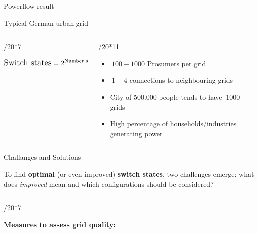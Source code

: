 \documentclass[final]{beamer}
\newlength{\colwidth}
\begin{document}
\begin{frame}[t]
\begin{columns}[t]
\begin{column}{\colwidth}
\begin{block}{Powerflow result}
 \end{block}

  \begin{exampleblock}{Typical German urban grid}

    \begin{columns}[t]
        
      \begin{column}{\colwidth/20*7}

        \begin{equation*}
          \begin{aligned}
           \large \text{Switch states} = 2^{\text{Number switches}}
          \end{aligned}
        \end{equation*}


      \end{column}

      \begin{column}{\colwidth/20*11}
        \begin{itemize}
          \item $~100-1000$ Prosumers per grid\autocite{Venios}
          \item $~1-4$ connections to neighbouring grids\autocite{Venios}
          \item City of 500.000 people tends to have $~1000$ grids\autocite{Venios}
          \item High percentage of households/industries generating power
        \end{itemize}
      \end{column}

    \end{columns}
    
    
  \end{exampleblock}

 \begin{block}{Challanges and Solutions}
 
  To find \textbf{optimal} (or even improved) \textbf{switch states}, two challenges emerge: what
  does \textit{improved} mean and which configurations should be considered?

  \begin{columns}[t]
          
    \begin{column}{\colwidth/20*7}

      \textbf{Measures to assess grid quality:}
    

\end{column}
\end{columns}
\end{block}
\end{column}
\end{columns}
\end{frame}
\end{document}
